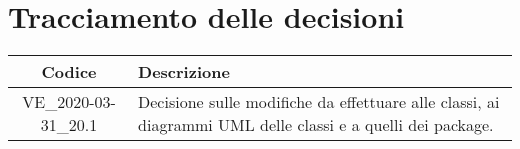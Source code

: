 \section*{Tracciamento delle decisioni}

\begin{center}
	\begin{longtable}{|c|p{12.25cm}|}
	\hline
	\rowcolor{lighter-grayer}
	\textbf{Codice} & \textbf{Descrizione} \\
	\hline
	\endfirsthead

	\hline
	VE\_2020-03-31\_20.1 & Decisione sulle modifiche da effettuare alle classi, ai diagrammi UML delle classi e a quelli dei package. \\
	\hline

	\end{longtable}
\end{center}

